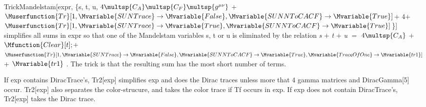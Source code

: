 




TrickMandelstam[expr, \{s, t, u, \(4\multsp {C_A}\multsp {C_F}\multsp {g^{\mu \nu }}\) \(+\) \(\Muserfunction{Tr}[1,\Mvariable{SUNTrace}\rightarrow
\Mvariable{False},\Mvariable{SUNNToCACF}\rightarrow \Mvariable{True}]\)\(+\) \(4\)\(+\) \(\Muserfunction{Tr}[1,\Mvariable{SUNTrace}\rightarrow \Mvariable{True},\Mvariable{SUNNToCACF}\rightarrow
\Mvariable{True}]\)\}] simplifies all sums in expr so that one of the Mandelstam variables s, t or u is eliminated by the relation {\itshape s} \(+\)
{\itshape t} \(+\) {\itshape u} \(=\) \(4\multsp {C_A}\) \(+\) \(\Mfunction{Clear}[t];\)\(+\) \(\Muserfunction{Tr}[1,\Mvariable{SUNTrace}\rightarrow
\Mvariable{False},\Mvariable{SUNNToCACF}\rightarrow \Mvariable{True},
    \Mvariable{TraceOfOne}\rightarrow \Mvariable{tr1}]\)\(+\) \(\Mvariable{tr1}\) . The trick is that the resulting sum has the most short number
of terms.








If exp contains DiracTrace's, Tr2[exp] simplifies exp and does the Dirac traces unless more that 4 gamma matrices and DiracGamma[5]
  occur. Tr2[exp] also separates the color-strucure, and takes the color trace if Tf occurs in exp. If exp does not contain DiracTrace's,
  Tr2[exp] takes the Dirac trace.



